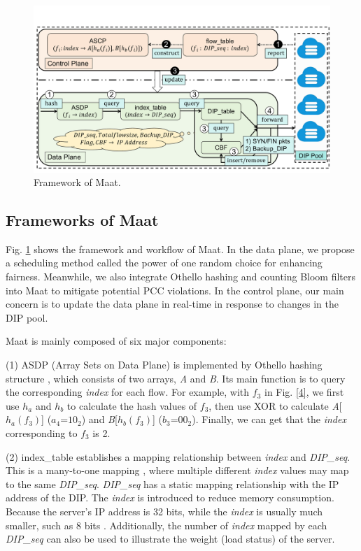 \begin{figure}[t]
	\setlength{\abovecaptionskip}{0pt}
	\setlength{\belowcaptionskip}{-10pt}
	\centering
	\includegraphics[width=1\linewidth]{figure/framework.pdf}
	\caption{Framework of Maat.}
	\label{5}
\end{figure}

\subsection{Frameworks of Maat}
Fig. \ref{5} shows the framework and workflow of Maat. In the data plane, we propose a scheduling method called the power of one random choice for enhancing fairness. Meanwhile, we also integrate Othello hashing and counting Bloom filters into Maat to mitigate potential PCC violations. In the control plane, our main concern is to update the data plane in real-time in response to changes in the DIP pool.

Maat is mainly composed of six major components:

(1) ASDP (Array Sets on Data Plane) is implemented by Othello hashing structure \cite{yu2018memory}, which consists of two arrays, \emph{A} and \emph{B}. Its main function is to query the corresponding \emph{index} for each flow. For example, with \emph{$f_{\text{3}}$} in Fig. \ref{4}, we first use \emph{$h_a$} and \emph{$h_b$} to calculate the hash values of \emph{$f_{\text{3}}$}, then use XOR to calculate \emph{A}[\emph{$h_a(f_{\text{3}})$}] (\emph{$a_4$}=$10_2$) and \emph{B}[\emph{$h_b(f_{\text{3}})$}] (\emph{$b_3$}=$00_2$). Finally, we can get that the \emph{index} corresponding to \emph{$f_{\text{3}}$} is 2.

(2) index\_table establishes a mapping relationship between \emph{index} and \emph{DIP_seq}. This is a many-to-one mapping \cite{olteanu2018stateless}, where multiple different \emph{index} values may map to the same \emph{DIP_seq}. \emph{DIP_seq} has a static mapping relationship with the IP address of the DIP. The \emph{index} is introduced to reduce memory consumption. Because the server's IP address is 32 bits, while the \emph{index} is usually much smaller, such as 8 bits \cite{shi2020concury}. Additionally, the number of \emph{index} mapped by each \emph{DIP_seq} can also be used to illustrate the weight (load status) of the server.


